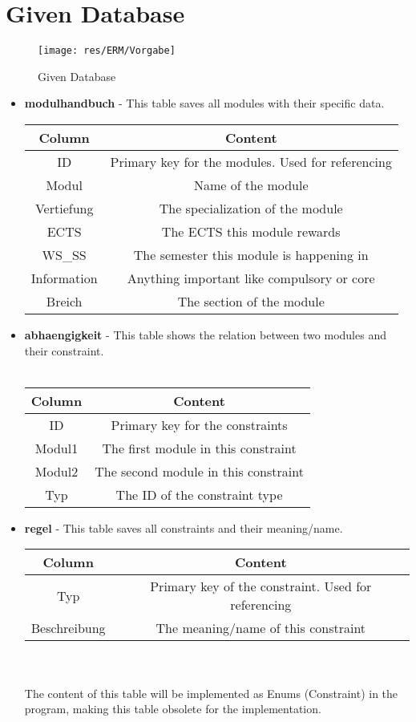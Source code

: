 \documentclass[11pt,a4paper]{report}
\begin{document}
{{{{{{{{{{{{{		\section{Given Database}{
			\begin{figure}[ht]
				\centering
				\texttt{[image: res/ERM/Vorgabe]}
				\caption{Given Database}
			\end{figure}
			\begin{itemize}
				\item \textbf{modulhandbuch} - This table saves all modules with their specific data. \\
					\begin{tabular}{|c|c|}
						\hline 
						\textbf{Column} & \textbf{Content} \\
						\hline 
						ID & Primary key for the modules. Used for referencing \\ 
						Modul & Name of the module \\ 
						Vertiefung & The specialization of the module \\ 
						ECTS & The ECTS this module rewards \\ 
						WS\_SS & The semester this module is happening in \\ 
						Information & Anything important like compulsory or core \\ 
						Breich & The section of the module \\ 
						\hline 
					\end{tabular}
				\item \textbf{abhaengigkeit} - This table shows the relation between two modules and their constraint. \\ \\
					\begin{tabular}{|c|c|}
						\hline 
						\textbf{Column} & \textbf{Content} \\
						\hline 
						ID & Primary key for the constraints \\ 
						Modul1 & The first module in this constraint \\ 
						Modul2 & The second module in this constraint \\ 
						Typ & The ID of the constraint type \\ 
						\hline 
					\end{tabular} 
				\item \textbf{regel} - This table saves all constraints and their meaning/name. \\
					\begin{tabular}{|c|c|}
						\hline 
						\textbf{Column} & \textbf{Content} \\
						\hline
						Typ & Primary key of the constraint. Used for referencing \\ 
						Beschreibung & The meaning/name of this constraint \\ 
						\hline 
					\end{tabular} \\ \\
					The content of this table will be implemented as Enums (Constraint) in the program, making this table obsolete for the implementation.
			\end{itemize}
		}
	
}}}}}}}}}}}}}
\end{document}
